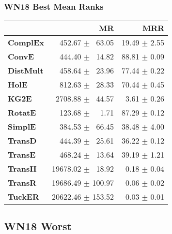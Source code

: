\documentclass{article}
\begin{document}
\subsubsection{WN18 Best Mean Ranks}
    \begin{center}
    \begin{tabular}{lrr}
\toprule
{} &                 MR &           MRR \\
\midrule
\textbf{ComplEx } &  $\phantom{5}$$\phantom{5}$452.67 $\pm$ $\phantom{5}$63.05 &  19.49 $\pm$ 2.55 \\
\textbf{ConvE   } &  $\phantom{5}$$\phantom{5}$444.40 $\pm$ $\phantom{5}$14.82 &  88.81 $\pm$ 0.09 \\
\textbf{DistMult} &  $\phantom{5}$$\phantom{5}$458.64 $\pm$ $\phantom{5}$23.96 &  77.44 $\pm$ 0.22 \\
\textbf{HolE    } &  $\phantom{5}$$\phantom{5}$812.63 $\pm$ $\phantom{5}$28.33 &  70.44 $\pm$ 0.45 \\
\textbf{KG2E    } &  $\phantom{5}$2708.88 $\pm$ $\phantom{5}$44.57 &  $\phantom{5}$3.61 $\pm$ 0.26 \\
\textbf{RotatE  } &  $\phantom{5}$$\phantom{5}$123.68 $\pm$ $\phantom{5}$$\phantom{5}$1.71 &  87.29 $\pm$ 0.12 \\
\textbf{SimplE  } &  $\phantom{5}$$\phantom{5}$384.53 $\pm$ $\phantom{5}$66.45 &  38.48 $\pm$ 4.00 \\
\textbf{TransD  } &  $\phantom{5}$$\phantom{5}$444.39 $\pm$ $\phantom{5}$25.61 &  36.22 $\pm$ 0.12 \\
\textbf{TransE  } &  $\phantom{5}$$\phantom{5}$468.24 $\pm$ $\phantom{5}$13.64 &  39.19 $\pm$ 1.21 \\
\textbf{TransH  } &  19678.02 $\pm$ $\phantom{5}$18.92 &  $\phantom{5}$0.18 $\pm$ 0.04 \\
\textbf{TransR  } &  19686.49 $\pm$ 100.97 &  $\phantom{5}$0.06 $\pm$ 0.02 \\
\textbf{TuckER  } &  20622.46 $\pm$ 153.52 &  $\phantom{5}$0.03 $\pm$ 0.01 \\
\bottomrule
\end{tabular}

    \end{center}
\subsection{WN18 Worst}
\end{document}
